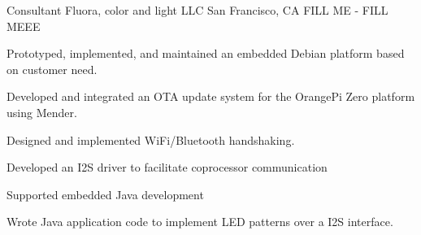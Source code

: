 \begin{cventries}
  \cventry
    {Consultant} %
    {Fluora, color and light LLC} %
    {San Francisco, CA} %
    {FILL ME - FILL MEEE} %
    {
      \begin{cvitems} %
      \item Prototyped, implemented, and maintained  an embedded Debian platform based on customer need.
      \item Developed and integrated an OTA update system for the OrangePi Zero platform using Mender.
      \item Designed and implemented WiFi/Bluetooth handshaking.
      \item Developed an I2S driver to facilitate coprocessor communication
      \item Supported embedded Java development
      \item Wrote Java application code to implement LED patterns over a I2S interface.
      \end{cvitems}
    }

\end{cventries}
